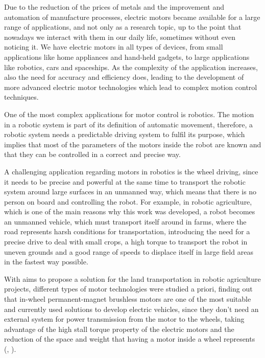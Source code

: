 Due to the reduction of the prices of metals and the improvement and automation of manufacture processes, electric motors became available for a large range of applications, and not only as a research topic, up to the point that nowadays we interact with them in our daily life, sometimes without even noticing it. We have electric motors in all types of devices, from small applications like home appliances and hand-held gadgets, to large applications like robotics, cars and spaceships. As the complexity of the application increases, also the need for accuracy and efficiency does, leading to the development of more advanced electric motor technologies which lead to complex motion control techniques.

One of the most complex applications for motor control is robotics. The motion in a robotic system is part of its definition of automatic movement, therefore, a robotic system needs a predictable driving system to fulfil its purpose, which implies that most of the parameters of the motors inside the robot are known and that they can be controlled in a correct and precise way.

A challenging application regarding motors in robotics is the wheel driving, since it needs to be precise and powerful at the same time to transport the robotic system around large surfaces in an unmanned way, which means that there is no person on board and controlling the robot. For example, in robotic agriculture, which is one of the main reasons why this work was developed, a robot becomes an unmanned vehicle, which must transport itself around in farms, where the road represents harsh conditions for transportation, introducing the need for a precise drive to deal with small crops, a high torque to transport the robot in uneven grounds and a good range of speeds to displace itself in large field areas in the fastest way possible.

With aims to propose a solution for the land transportation in robotic agriculture projects, different types of motor technologies were studied a priori, finding out that in-wheel permanent-magnet brushless motors are one of the most suitable and currently used solutions to develop electric vehicles, since they don’t need an external system for power transmission from the motor to the wheels, taking advantage of the high stall torque property of the electric motors and the reduction of the space and weight that having a motor inside a wheel represents (\citeauthor{robi:2017}, \citeyear{robi:2017}).


